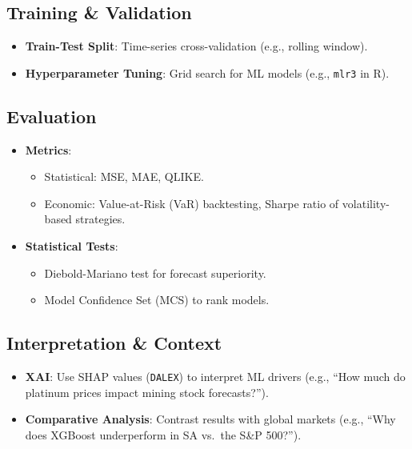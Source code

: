 \documentclass[11pt,preprint]{elsarticle}
\numberwithin{equation}{section}
\numberwithin{figure}{section}
\numberwithin{table}{section}
\def\tightlist{} %
\begin{document}
\subsection{Training \& Validation}\label{training-validation}

\begin{itemize}
\tightlist
\item
  \textbf{Train-Test Split}: Time-series cross-validation (e.g., rolling
  window).\\
\item
  \textbf{Hyperparameter Tuning}: Grid search for ML models (e.g.,
  \texttt{mlr3} in R).
\end{itemize}

\subsection{Evaluation}\label{evaluation}

\begin{itemize}
\tightlist
\item
  \textbf{Metrics}:

  \begin{itemize}
  \tightlist
  \item
    Statistical: MSE, MAE, QLIKE.\\
  \item
    Economic: Value-at-Risk (VaR) backtesting, Sharpe ratio of
    volatility-based strategies.\\
  \end{itemize}
\item
  \textbf{Statistical Tests}:

  \begin{itemize}
  \tightlist
  \item
    Diebold-Mariano test for forecast superiority.\\
  \item
    Model Confidence Set (MCS) to rank models.
  \end{itemize}
\end{itemize}

\subsection{Interpretation \& Context}\label{interpretation-context}

\begin{itemize}
\tightlist
\item
  \textbf{XAI}: Use SHAP values (\texttt{DALEX}) to interpret ML drivers
  (e.g., ``How much do platinum prices impact mining stock
  forecasts?'').\\
\item
  \textbf{Comparative Analysis}: Contrast results with global markets
  (e.g., ``Why does XGBoost underperform in SA vs.~the S\&P 500?'').
\end{itemize}
\end{document}
